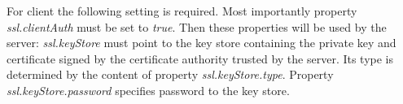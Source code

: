 For client the following setting is required. Most importantly property
\emph{ssl.clientAuth} must be set to \emph{true}. Then these properties will be
used by the server: \emph{ssl.keyStore} must point to the key store containing
the private key and certificate signed by the certificate authority trusted by
the server. Its type is determined by the content of property
\emph{ssl.keyStore.type}. Property \emph{ssl.keyStore.password} specifies password
to the key store.
